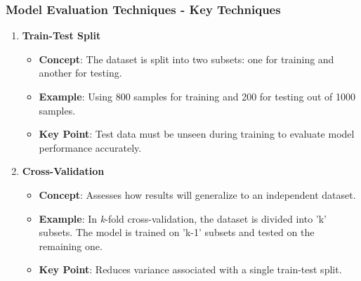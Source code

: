 \documentclass{beamer}
\begin{document}
\begin{frame}[fragile]
    \frametitle{Model Evaluation Techniques - Key Techniques}
    \begin{enumerate}
        \item \textbf{Train-Test Split}
        \begin{itemize}
            \item \textbf{Concept}: The dataset is split into two subsets: one for training and another for testing.
            \item \textbf{Example}: Using 800 samples for training and 200 for testing out of 1000 samples.
            \item \textbf{Key Point}: Test data must be unseen during training to evaluate model performance accurately.
        \end{itemize}
        
        \item \textbf{Cross-Validation}
        \begin{itemize}
            \item \textbf{Concept}: Assesses how results will generalize to an independent dataset.
            \item \textbf{Example}: In \textit{k}-fold cross-validation, the dataset is divided into 'k' subsets. The model is trained on 'k-1' subsets and tested on the remaining one.
            \item \textbf{Key Point}: Reduces variance associated with a single train-test split.
        \end{itemize}
    \end{enumerate}
\end{frame}
\end{document}
